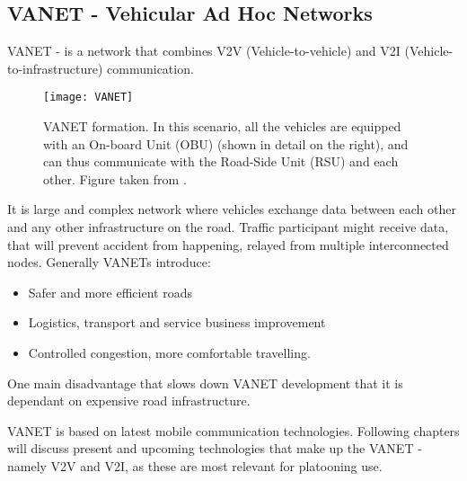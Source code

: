 \subsection{VANET - Vehicular Ad Hoc Networks}

VANET - is a network that combines V2V (Vehicle-to-vehicle) and V2I (Vehicle-to-infrastructure) communication.\par
% 
\begin{figure}[ht]
\texttt{[image: VANET]}
\caption{VANET formation. In this scenario, all the vehicles are equipped with an On-board Unit (OBU) (shown in detail on the right), and can thus communicate with the Road-Side Unit (RSU) and each other. Figure taken from \cite{Jia2016ASystems}.}
\label{fig:VANETformation}
\end{figure}
% 
It is large and complex network where vehicles exchange data between each other and any other infrastructure on the road. Traffic participant might receive data, that will prevent accident from happening, relayed from multiple interconnected nodes. Generally VANETs introduce:

\begin{itemize}[noitemsep,nolistsep]
    \item Safer and more efficient roads
    \item Logistics, transport and service business improvement
    \item Controlled congestion, more comfortable travelling.
\end{itemize}

One main disadvantage that slows down VANET development that it is dependant on expensive road infrastructure\footnotemark.\par
% 
% 
VANET is based on latest mobile communication technologies. Following chapters will discuss present and upcoming technologies that make up the VANET - namely V2V and V2I, as these are most relevant for platooning use.
